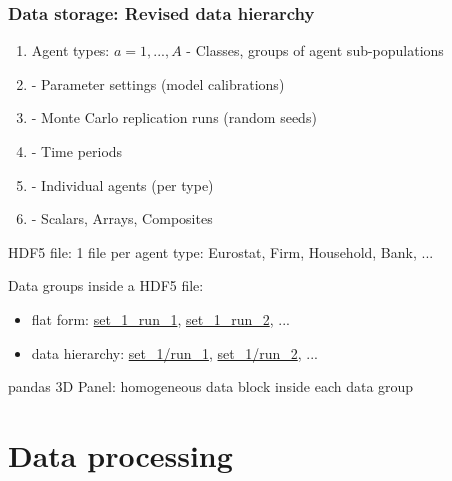 \documentclass[9pt,sansserif]{beamer}
\newlength{\parskipbackup}
\newlength{\parindentbackup}
\let\notebackup\note
\renewcommand{\note}[1]{\notebackup{%
	\mode<handout>{\addtocounter{page}{-1}}%
	\setlength{\parindent}{0ex}%
	\setlength{\parskip}{10pt}%
	\noindent%
	{\normalsize{}#1}%
	\setlength{\parskip}{\parskipbackup}%
	\setlength{\parindent}{\parindentbackup}%
}%
}
\begin{document}
\begin{frame}{}\small
\frametitle{Data storage: Revised data hierarchy}

\begin{enumerate}\itemsep1em

\item {\color{darkgreen}Agent types: $a=1,...,A$} - Classes, groups of agent sub-populations

\item {} - Parameter settings (model calibrations)

\item {} - Monte Carlo replication runs (random seeds)

\item {} - Time periods

\item {} - Individual agents (per type)

\item {} - Scalars, Arrays, Composites
\end{enumerate}

\bigskip
{\color{darkgreen}HDF5 file}: 1 file per agent type: Eurostat, Firm, Household, Bank, ...

\bigskip
{\color{darkblue}Data groups inside a HDF5 file}: 
\begin{itemize}
\item flat form:  \url{set_1_run_1}, \url{set_1_run_2}, ...
\item data hierarchy: \url{set_1/run_1}, \url{set_1/run_2}, ...
\end{itemize}

\bigskip
{\color{darkred}pandas 3D Panel}: homogeneous data block inside each data group

\end{frame}
\note{
}

\section{Data processing}
\end{document}
